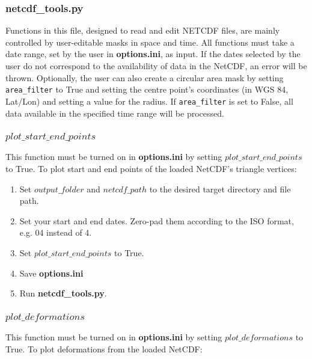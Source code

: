 \documentclass{article}
\begin{document}
        \subsubsection*{\textbf{netcdf\_tools.py}}

            Functions in this file, designed to read and edit NETCDF files, are mainly controlled by user-editable masks in space and time. All functions must take a date range, set by the user in \textbf{options.ini}, as input. If the dates selected by the user do not correspond to the availability of data in the NetCDF, an error will be thrown. Optionally, the user can also create a circular area mask by setting \verb?area_filter? to True and setting the centre point's coordinates (in WGS 84, Lat/Lon) and setting a value for the radius. If \verb?area_filter? is set to False, all data available in the specified time range will be processed.

        \subsubsection*{$plot\_start\_end\_points$}

            This function must be turned on in \textbf{options.ini} by setting $plot\_start\_end\_points$ to True. To plot start and end points of the loaded NetCDF's triangle vertices:

            \begin{enumerate}
                \item Set $output\_folder$ and $netcdf\_path$ to the desired target directory and file path.
                \item Set your start and end dates. Zero-pad them according to the ISO format, e.g. 04 instead of 4.
                \item Set $plot\_start\_end\_points$ to True.
                \item Save \textbf{options.ini}
                \item Run \textbf{netcdf\_tools.py}.
            \end{enumerate}

        \subsubsection*{$plot\_deformations$}

            This function must be turned on in \textbf{options.ini} by setting $plot\_deformations$ to True. To plot deformations from the loaded NetCDF:
\end{document}
